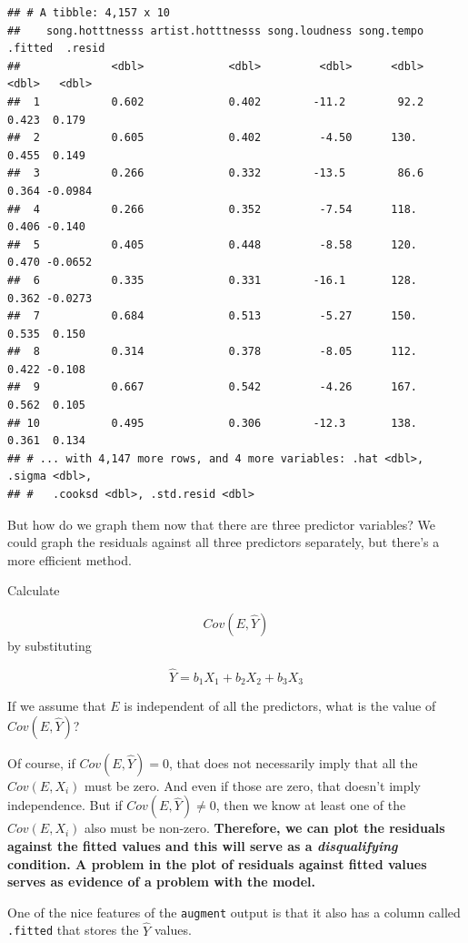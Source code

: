 \documentclass[
]{book}
\begin{document}
\begin{verbatim}
## # A tibble: 4,157 x 10
##    song.hotttnesss artist.hotttnesss song.loudness song.tempo .fitted  .resid
##              <dbl>             <dbl>         <dbl>      <dbl>   <dbl>   <dbl>
##  1           0.602             0.402        -11.2        92.2   0.423  0.179 
##  2           0.605             0.402         -4.50      130.    0.455  0.149 
##  3           0.266             0.332        -13.5        86.6   0.364 -0.0984
##  4           0.266             0.352         -7.54      118.    0.406 -0.140 
##  5           0.405             0.448         -8.58      120.    0.470 -0.0652
##  6           0.335             0.331        -16.1       128.    0.362 -0.0273
##  7           0.684             0.513         -5.27      150.    0.535  0.150 
##  8           0.314             0.378         -8.05      112.    0.422 -0.108 
##  9           0.667             0.542         -4.26      167.    0.562  0.105 
## 10           0.495             0.306        -12.3       138.    0.361  0.134 
## # ... with 4,147 more rows, and 4 more variables: .hat <dbl>, .sigma <dbl>,
## #   .cooksd <dbl>, .std.resid <dbl>
\end{verbatim}

But how do we graph them now that there are three predictor variables? We could graph the residuals against all three predictors separately, but there's a more efficient method.

Calculate

\[
Cov(E, \hat{Y})
\]
by substituting

\[
\hat{Y} = b_{1}X_{1} + b_{2}X_{2} + b_{3}X_{3} 
\]

If we assume that \(E\) is independent of all the predictors, what is the value of \(Cov(E, \hat{Y})\)?

Of course, if \(Cov(E, \hat{Y}) = 0\), that does not necessarily imply that all the \(Cov(E, X_{i})\) must be zero. And even if those are zero, that doesn't imply independence. But if \(Cov(E, \hat{Y}) \neq 0\), then we know at least one of the \(Cov(E, X_{i})\) also must be non-zero. \textbf{Therefore, we can plot the residuals against the fitted values and this will serve as a \emph{disqualifying} condition. A problem in the plot of residuals against fitted values serves as evidence of a problem with the model.}

One of the nice features of the \texttt{augment} output is that it also has a column called \texttt{.fitted} that stores the \(\hat{Y}\) values.
\end{document}
